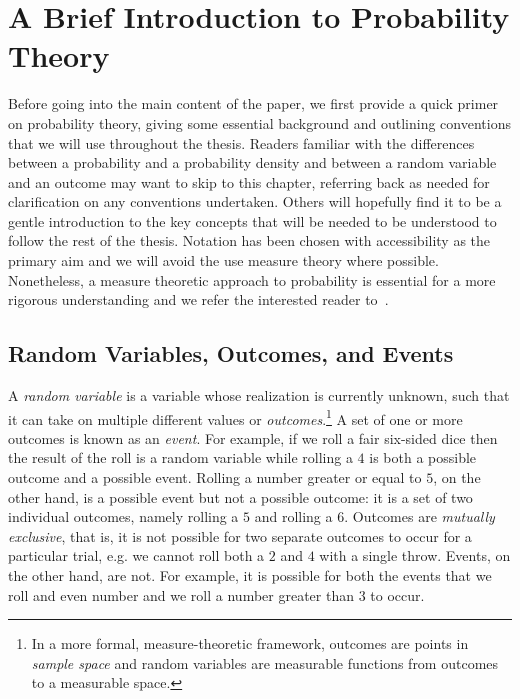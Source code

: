 
\chapter{A Brief Introduction to Probability Theory}
\label{chp:prob}

Before going into the main content of the paper, we first provide a quick primer on probability
theory, giving some essential background and outlining conventions
that we will use throughout the thesis.  Readers familiar with the differences between a probability
and a probability density and between a random variable and an outcome may want to skip to this
chapter, referring back as needed for clarification on any conventions undertaken.  Others
will hopefully find it to be a gentle introduction to the key concepts that will be needed to
be understood to follow the rest of the thesis.  Notation has been chosen with accessibility 
as the primary aim and we will avoid
the use measure theory where possible.  Nonetheless, a measure theoretic
approach to probability is essential for a more rigorous understanding and we refer
the interested reader to~\cite{durrett2010probability}.

\section{Random Variables, Outcomes, and Events}
\label{sec:prob:random}

A \emph{random variable} is a variable
whose realization is currently unknown, such that it can take on multiple different
values or \emph{outcomes}.\footnote{In a more formal, measure-theoretic framework, outcomes are points in \emph{sample
		space} and random variables are measurable functions from outcomes to a measurable
	space.}
A set of one or more outcomes is known as an \emph{event}.
For example, if we roll a fair six-sided dice then the result of the roll is a random variable 
while rolling a $4$ is both a possible outcome and a possible event.  Rolling a number greater
or equal to $5$, on the other hand, is a possible event but not a possible outcome: it is a set
of two individual outcomes, namely rolling a $5$ and rolling a $6$.  Outcomes are
\emph{mutually exclusive}, that is, it is not possible for two separate outcomes to occur for a particular trial, e.g.
we cannot roll both a $2$ and $4$ with a single throw.
Events, on the other hand, are not. For example, it is possible for both the events that we
roll and even number and we roll a number greater than $3$ to occur.

